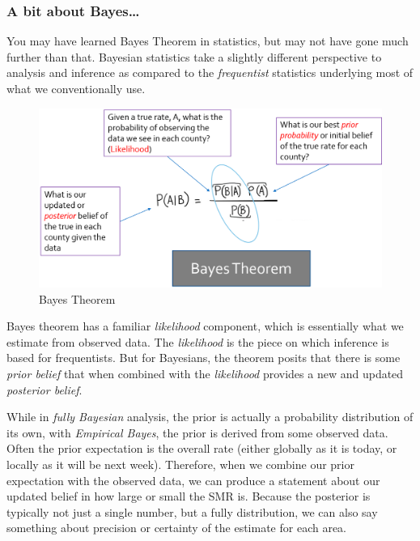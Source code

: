 \documentclass[
]{book}
\begin{document}
\hypertarget{a-bit-about-bayes}{%
\subsubsection{A bit about Bayes\ldots{}}\label{a-bit-about-bayes}}

You may have learned Bayes Theorem in statistics, but may not have gone much further than that. Bayesian statistics take a slightly different perspective to analysis and inference as compared to the \emph{frequentist} statistics underlying most of what we conventionally use.

\begin{figure}
\centering
\includegraphics{images/bayes.png}
\caption{\label{fig:unnamed-chunk-20}Bayes Theorem}
\end{figure}

Bayes theorem has a familiar \emph{likelihood} component, which is essentially what we estimate from observed data. The \emph{likelihood} is the piece on which inference is based for frequentists. But for Bayesians, the theorem posits that there is some \emph{prior belief} that when combined with the \emph{likelihood} provides a new and updated \emph{posterior belief}.

While in \emph{fully Bayesian} analysis, the prior is actually a probability distribution of its own, with \emph{Empirical Bayes}, the prior is derived from some observed data. Often the prior expectation is the overall rate (either globally as it is today, or locally as it will be next week). Therefore, when we combine our prior expectation with the observed data, we can produce a statement about our updated belief in how large or small the SMR is. Because the posterior is typically not just a single number, but a fully distribution, we can also say something about precision or certainty of the estimate for each area.
\end{document}

